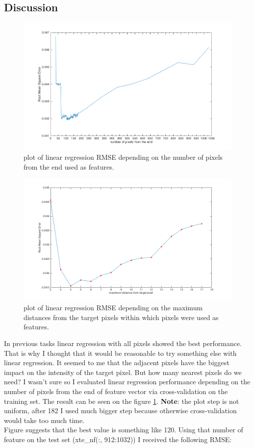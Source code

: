 \documentclass{article}
\begin{document}
		\subsection{Discussion}
		 	\begin{figure}[t]
		 		\centering
		 		\includegraphics[width=16cm]{images/p1-6_num_pixels.png}
		 		\caption{plot of linear regression RMSE depending on the number of pixels from the end  used as features.}
		 		\label{fig:p1-6_num_pixels}
		 	\end{figure}
		 	\begin{figure}[t]
		 		\centering
		 		\includegraphics[width=16cm]{images/p1-6_closest_pixels.png}
		 		\caption{plot of linear regression RMSE depending on the maximum distances from the target pixels within which pixels were  used as features.}
		 		\label{fig:p1-6_closest_pixels}	
		 	\end{figure}
		 	In previous tasks linear regression with all pixels showed the best performance. That is why I thought that it would be reasonable to try something else with linear regression. It seemed to me that the adjacent pixels have the biggest impact on the intensity of the target pixel. But how many nearest pixels do we need? I wasn't sure so I evaluated linear regression performance depending on the number of pixels from the end of feature vector via cross-validation on the training set. The result can be seen on the figure \ref{fig:p1-6_num_pixels}. \textbf{Note}: the plot step is not uniform, after 182 I used much bigger step because otherwise cross-validation would take too much time.\\ Figure suggests that the best value is something like 120. Using that number of feature on the test set (xte\_nf(:, 912:1032)) I received the following RMSE:
\end{document}

